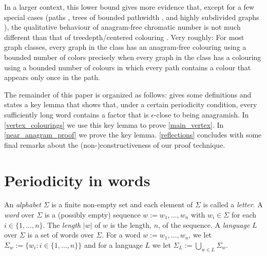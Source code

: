 \documentclass{patmorin}
\begin{document}
In a larger context, this lower bound gives more evidence that, except for a few special cases (paths \cite{evdokimov:strongly,pleasants:non-repetitive,keranen:abelian}, trees of bounded pathwidth \cite{wilson.wood:anagram-free}, and highly subdivided graphs \cite{wilson.wood:anagram-free2}), the qualitative behaviour of anagram-free chromatic number is not much different than that of treedepth/centered colouring \cite{nesetril.ossona:tree-depth}.  Very roughly: For most graph classes, every graph in the class has an anagram-free colouring using a bounded number of colors precisely when every graph in the class has a colouring using a bounded number of colours in which every path contains a colour that appears only once in the path.

%
%



The remainder of this paper is organized as follows:  gives some definitions and states a key lemma that shows that, under a certain periodicity condition, every sufficiently long word contains a factor that is $\epsilon$-close to being anagramish.
In \cref{vertex_colourings} we use this key lemma to prove \cref{main_vertex}.  In \cref{near_anagram_proof} we prove the key lemma. \cref{reflections} concludes with some final remarks about the (non-)constructiveness of our proof technique.

\section{Periodicity in words}
\label{near_anagram_statement}

An \emph{alphabet} $\Sigma$ is a finite non-empty set and each element of $\Sigma$ is called a \emph{letter}. A \emph{word} over $\Sigma$ is a (possibly empty) sequence $w:=w_1,\ldots,w_n$ with $w_i\in\Sigma$ for each $i\in\{1,\ldots,n\}$. The \emph{length} $|w|$ of $w$ is the length, $n$, of the sequence.  A \emph{language} $L$ over $\Sigma$ is a set of words over $\Sigma$.  For a word $w:=w_1,\ldots,w_n$, we let $\Sigma_w:=\{w_i:i\in\{1,\ldots,n\}\}$ and for a language $L$ we let $\Sigma_L:=\bigcup_{w\in L}\Sigma_w$.
\end{document}
